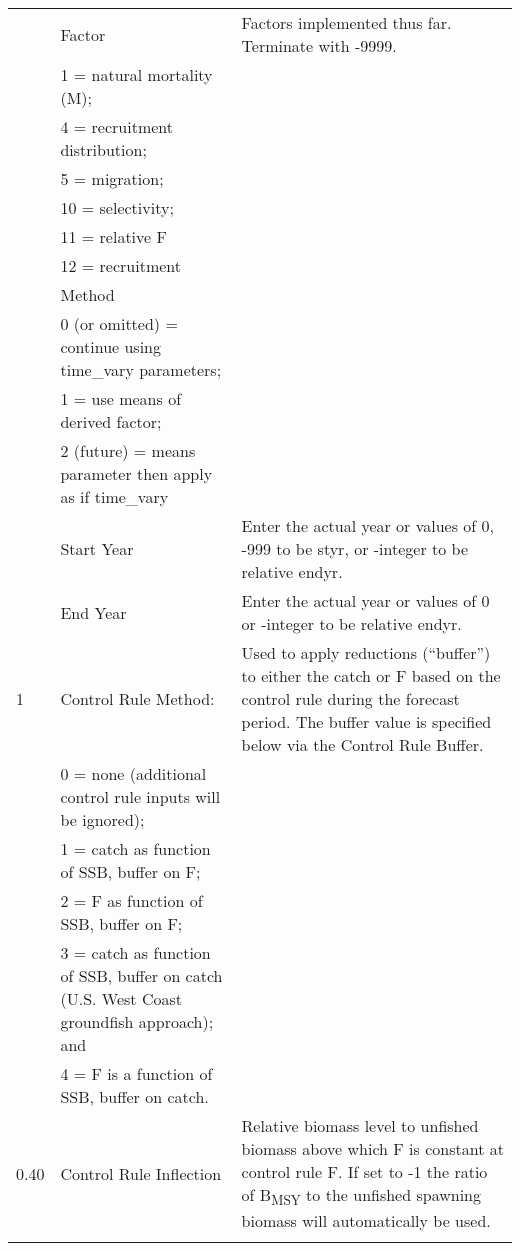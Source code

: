 \begin{landscape}
{\begin{longtable}{p{2cm} p{7cm} p{12cm}}
   & Factor & \multirow{1}{1cm}[-0.15cm]{\parbox{12cm}{Factors implemented thus far. Terminate with -9999.}} \\
   & 1 = natural mortality (M); & \\
   & 4 = recruitment distribution; & \\
   & 5 = migration; & \\
   & 10 = selectivity; & \\
   & 11 = relative F & \\
   & 12 = recruitment & \\

   & Method & \Tstrut\\
   & 0 (or omitted) = continue using time\_vary parameters; & \\
   & 1 = use means of derived factor; & \\
   & 2 (future) = means parameter then apply as if time\_vary & \\
   & Start Year & Enter the actual year or values of 0, -999 to be styr, or -integer to be relative endyr. \\
   & End Year & Enter the actual year or values of 0 or -integer to be relative endyr. \\
  
  \pagebreak
  1 & Control Rule Method: & \multirow{1}{1cm}[-0.15cm]{\parbox{12cm}{Used to apply reductions (``buffer'') to either the catch or F based on the control rule during the forecast period. The buffer value is specified below via the Control Rule Buffer.}} \Tstrut\\
    & 0 = none (additional control rule inputs will be ignored); & \\
    & 1 = catch as function of SSB, buffer on F; & \\
    & 2 = F as function of SSB, buffer on F; & \\
    & 3 = catch as function of SSB, buffer on catch (U.S. West Coast groundfish approach); and & \\
    & 4 = F is a function of SSB, buffer on catch. & \Bstrut\\
  \hline

  0.40 \Tstrut & Control Rule Inflection & \multirow{1}{1cm}[-0.2cm]{\parbox{12cm}{Relative biomass level to unfished biomass above which F is constant at control rule F. If set to -1 the ratio of B\textsubscript{MSY} to the unfished spawning biomass will automatically be used.}} \Bstrut\\
    & & \Tstrut\Bstrut\\


\end{longtable}}
\end{landscape}
